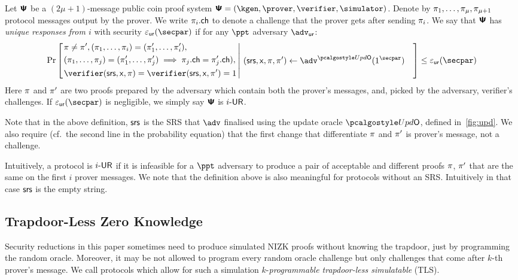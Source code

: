 \begin{definition}
	\label{def:wiuru}
	Let $\bm{\mathsf{\Psi}}$ be a $(2\mu + 1)$-message public coin proof system
  $\ps = (\kgen, \prover, \verifier, \simulator)$. Denote
  by $\pi_1, \ldots, \pi_{\mu}, \pi_{\mu + 1}$ protocol messages
  output by the prover. We write $\pi_i.\mathsf{ch}$ to denote a challenge that the prover gets after sending $\pi_{i}$. We say that $\bm{\mathsf{\Psi}}$ has \emph{unique responses from $i$} with security $\epsur(\secpar)$ if for any $\ppt$ adversary $\advur$:
  \[
	\Pr\left[
		\left.
	\begin{aligned}
	& \zkproof \neq \zkproof', (\zkproof_1, \ldots, \zkproof_{i}) = (\zkproof'_1,
	\ldots, \zkproof'_{i}), \\
	& (\zkproof_{1}, \ldots, \zkproof_{j}) = (\zkproof'_{1}, \ldots, \zkproof'_{j}) \implies \zkproof_{j}.\ch = \zkproof'_{j}.\ch),\\
	& \verifier (\srs, \inp, \zkproof) =
	\verifier (\srs, \inp, \zkproof') = 1  \\
	\end{aligned}
	\,\right|\,
	\begin{aligned}
		& (\srs, \inp, \zkproof, \zkproof') \gets \adv^{\initU}(1^\secpar) 
	\end{aligned}
	\right] \leq \epsur(\secpar) 
	\]
	Here $\pi$ and $\pi'$ are two proofs prepared by the adversary which contain both the prover's messages, and, picked by the adversary, verifier's challenges. If $\epsur(\secpar)$ is negligible, we simply say $\bm{\mathsf{\Psi}}$ is ${i\text{-}\mathsf{UR}}$.
\end{definition}
%
Note that in the above definition, $\mathsf{srs}$ is the SRS that $\advse$ finalised using
the update oracle $\initU$, defined in~\cref{fig:upd}. We also require (cf.~the second line in the probability equation) that the first change that differentiate $\pi$ and $\pi'$ is prover's message, not a challenge. 

Intuitively, a protocol is ${i\text{-}\mathsf{UR}}$ if it is infeasible for a $\ppt$ adversary to
produce a pair of acceptable and different proofs $\pi$, $\pi'$ that are
the same on the first $i$ prover messages.  We note that the definition above is also
meaningful for protocols without an SRS. Intuitively in that case $\mathsf{srs}$ is the empty
string.

 \subsection{Trapdoor-Less Zero Knowledge}
 Security reductions in this paper sometimes need to produce simulated NIZK proofs without
 knowing the trapdoor, just by programming the random oracle. Moreover, it may be not allowed to program every random oracle challenge but only challenges that come after $k$-th prover's message. We call protocols which allow for such a simulation $k$-\emph{programmable trapdoor-less simulatable} (TLS).

